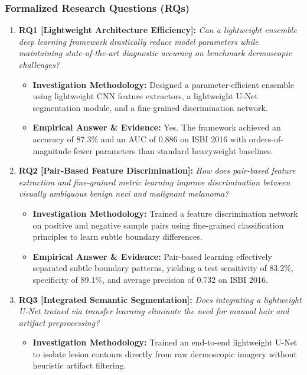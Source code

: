 \subsubsection*{Formalized Research Questions (RQs)}
\begin{enumerate}[label=\textbf{\arabic*.}, leftmargin=*]
  \item \textbf{RQ1 [Lightweight Architecture Efficiency]:} \textit{Can a lightweight ensemble deep learning framework drastically reduce model parameters while maintaining state-of-the-art diagnostic accuracy on benchmark dermoscopic challenges?}
  \begin{itemize}[leftmargin=1.5em]
    \item \textbf{Investigation Methodology:} Designed a parameter-efficient ensemble using lightweight CNN feature extractors, a lightweight U-Net segmentation module, and a fine-grained discrimination network.
    \item \textbf{Empirical Answer \& Evidence:} Yes. The framework achieved an accuracy of 87.3\% and an AUC of 0.886 on ISBI 2016 with orders-of-magnitude fewer parameters than standard heavyweight baselines.
  \end{itemize}
  \item \textbf{RQ2 [Pair-Based Feature Discrimination]:} \textit{How does pair-based feature extraction and fine-grained metric learning improve discrimination between visually ambiguous benign nevi and malignant melanoma?}
  \begin{itemize}[leftmargin=1.5em]
    \item \textbf{Investigation Methodology:} Trained a feature discrimination network on positive and negative sample pairs using fine-grained classification principles to learn subtle boundary differences.
    \item \textbf{Empirical Answer \& Evidence:} Pair-based learning effectively separated subtle boundary patterns, yielding a test sensitivity of 83.2\%, specificity of 89.1\%, and average precision of 0.732 on ISBI 2016.
  \end{itemize}
  \item \textbf{RQ3 [Integrated Semantic Segmentation]:} \textit{Does integrating a lightweight U-Net trained via transfer learning eliminate the need for manual hair and artifact preprocessing?}
  \begin{itemize}[leftmargin=1.5em]
    \item \textbf{Investigation Methodology:} Trained an end-to-end lightweight U-Net to isolate lesion contours directly from raw dermoscopic imagery without heuristic artifact filtering.

\end{itemize}
\end{enumerate}
